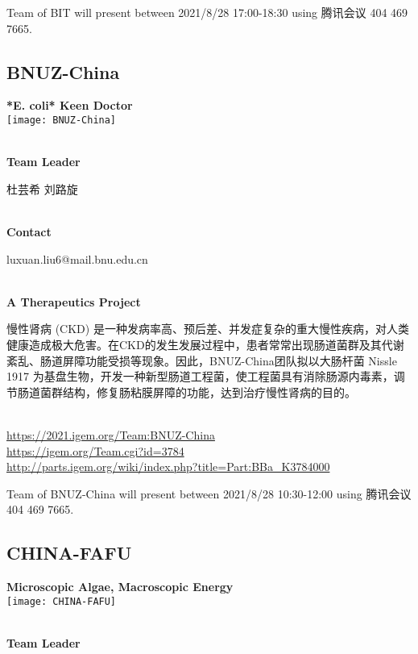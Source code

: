 \vfill{}









Team of BIT will present between        2021/8/28 17:00-18:30 using 腾讯会议 404 469 7665.
\newpage


\subsection{\textcolor{Blu}{ BNUZ-China } }
\vspace{5mm}
\begin{center}
\large{
  \textbf{ *E. coli* Keen Doctor }\\
  \texttt{[image: BNUZ-China]}
}
\end{center}
\textbf{\\Team Leader}

  杜芸希
  刘路旋


\textbf{\\Contact}

  luxuan.liu6@mail.bnu.edu.cn


\textbf{\\A Therapeutics Project\\}\begin{spacing}{1.5}

慢性肾病 (CKD) 是一种发病率高、预后差、并发症复杂的重大慢性疾病，对人类健康造成极大危害。在CKD的发生发展过程中，患者常常出现肠道菌群及其代谢紊乱、肠道屏障功能受损等现象。因此，BNUZ-China团队拟以大肠杆菌 Nissle 1917 为基盘生物，开发一种新型肠道工程菌，使工程菌具有消除肠源内毒素，调节肠道菌群结构，修复肠粘膜屏障的功能，达到治疗慢性肾病的目的。\end{spacing}
\\

\url{https://2021.igem.org/Team:BNUZ-China }\\
\url{https://igem.org/Team.cgi?id=3784 }\\
\url{http://parts.igem.org/wiki/index.php?title=Part:BBa_K3784000 }\\


\vfill{}









Team of BNUZ-China will present between     2021/8/28 10:30-12:00    using 腾讯会议 404 469 7665.
\newpage


\subsection{\textcolor{Blu}{ CHINA-FAFU } }
\vspace{5mm}
\begin{center}
\large{
  \textbf{ Microscopic Algae, Macroscopic Energy }\\
  \texttt{[image: CHINA-FAFU]}
}
\end{center}
\textbf{\\Team Leader}

